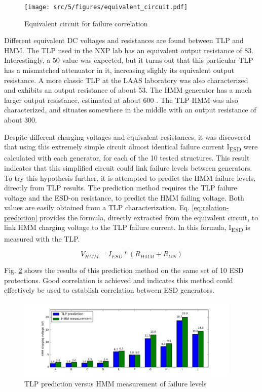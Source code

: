 \begin{figure}[!h]
  \centering
  \texttt{[image: src/5/figures/equivalent\_circuit.pdf]}
  \caption{Equivalent circuit for failure correlation}
  \label{fig:simple_equivalent_circuit}
\end{figure}

Different equivalent DC voltages and resistances are found between TLP and HMM.
The TLP used in the NXP lab has an equivalent output resistance of 83\textOmega{}.
Interestingly, a 50\textOmega{} value was expected, but it turns out that this particular TLP has a mismatched attenuator in it, increasing slighly its equivalent output resistance.
A more classic TLP at the LAAS laboratory was also characterized and exhibits an output resistance of about 53\textOmega{}.
The HMM generator has a much larger output resistance, estimated at about 600 \textOmega{}.
The TLP-HMM was also characterized, and situates somewhere in the middle with an output resistance of about 300\textOmega{}.

Despite different charging voltages and equivalent resistances, it was discovered that using this extremely simple circuit almost identical failure current I\textsubscript{ESD} were calculated with each generator, for each of the 10 tested structures.
This result indicates that this simplified circuit could link failure levels between generators.
To try this hypothesis further, it is attempted to predict the HMM failure levels, directly from TLP results.
The prediction method requires the TLP failure voltage and the ESD-on resistance, to predict the HMM failing voltage.
Both values are easily obtained from a TLP characterization.
Eq. \ref{eq:relation-prediction} provides the formula, directly extracted from the equivalent circuit, to link HMM charging voltage to the TLP failure current.
In this formula, I\textsubscript{ESD} is measured with the TLP.

\begin{equation}
V_{HMM} = I_{ESD} * (R_{HMM} + R_{ON})
\label{eq:relation-prediction}
\end{equation}

Fig. \ref{fig:predicted_vs_measured_levels} shows the results of this prediction method on the same set of 10 ESD protections.
Good correlation is achieved and indicates this method could effectively be used to establish correlation between ESD generators.

\begin{figure}[!h]
  \centering
  \includegraphics[width=0.95\textwidth]{src/5/figures/correlation_results.png}
  \caption{TLP prediction versus HMM measurement of failure levels}
  \label{fig:predicted_vs_measured_levels}
\end{figure}

